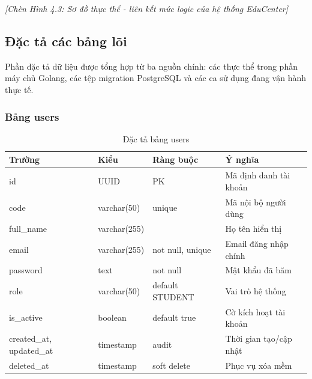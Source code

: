 \documentclass[../DoAn.tex]{subfiles}
\begin{document}
\textit{[Chèn Hình 4.3: Sơ đồ thực thể - liên kết mức logic của hệ thống EduCenter]}

\subsection{Đặc tả các bảng lõi}

Phần đặc tả dữ liệu được tổng hợp từ ba nguồn chính: các thực thể trong phần máy chủ Golang, các tệp migration PostgreSQL và các ca sử dụng đang vận hành thực tế.

\subsubsection{Bảng users}
\begin{table}[H]
\centering
\caption{Đặc tả bảng users}
\scriptsize
\begin{tabular}{|l|l|l|p{4cm}|}
\hline
\textbf{Trường} & \textbf{Kiểu} & \textbf{Ràng buộc} & \textbf{Ý nghĩa} \\ \hline
id & UUID & PK & Mã định danh tài khoản \\ \hline
code & varchar(50) & unique & Mã nội bộ người dùng \\ \hline
full\_name & varchar(255) & & Họ tên hiển thị \\ \hline
email & varchar(255) & not null, unique & Email đăng nhập chính \\ \hline
password & text & not null & Mật khẩu đã băm \\ \hline
role & varchar(50) & default STUDENT & Vai trò hệ thống \\ \hline
is\_active & boolean & default true & Cờ kích hoạt tài khoản \\ \hline
created\_at, updated\_at & timestamp & audit & Thời gian tạo/cập nhật \\ \hline
deleted\_at & timestamp & soft delete & Phục vụ xóa mềm \\ \hline
\end{tabular}
\end{table}
\end{document}
